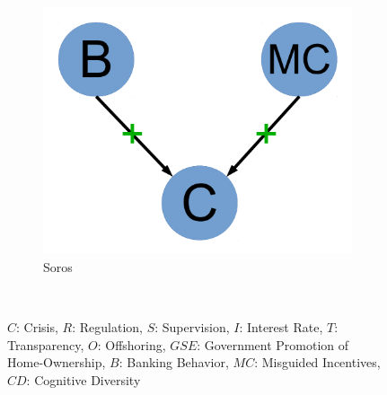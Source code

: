 \documentclass[12pt]{article}
\begin{document}
\begin{figure}
\begin{subfigure}[b]{0.2\textwidth}
                \includegraphics[width=\textwidth]{soros.pdf}
                \caption{\footnotesize Soros}
                \label{fig:soros}
        \end{subfigure}
        ~ %
       \caption{$C$: Crisis, $R$: Regulation, $S$: Supervision, $I$: Interest Rate, $T$: Transparency, $O$: Offshoring, $GSE$: Government Promotion of Home-Ownership, $B$: Banking Behavior, $MC$: Misguided Incentives, $CD$: Cognitive Diversity}\label{fig:committe1}
\end{figure}
\end{document}
